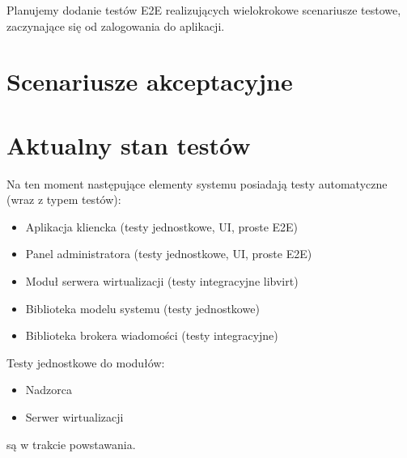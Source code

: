 \documentclass[12pt]{article}
\begin{document}
Planujemy dodanie testów E2E realizujących wielokrokowe scenariusze testowe, zaczynające się od zalogowania do aplikacji.

\section{Scenariusze akceptacyjne}

\section{Aktualny stan testów}
Na ten moment następujące elementy systemu posiadają testy automatyczne (wraz z typem testów):
\begin{itemize}
	\item Aplikacja kliencka (testy jednostkowe, UI, proste E2E)
	\item Panel administratora (testy jednostkowe, UI, proste E2E)
	\item Moduł serwera wirtualizacji (testy integracyjne libvirt)
	\item Biblioteka modelu systemu (testy jednostkowe)
	\item Biblioteka brokera wiadomości (testy integracyjne)
\end{itemize}
Testy jednostkowe do modułów:
\begin{itemize}
	\item Nadzorca
	\item Serwer wirtualizacji
\end{itemize}
są w trakcie powstawania.
\end{document}
